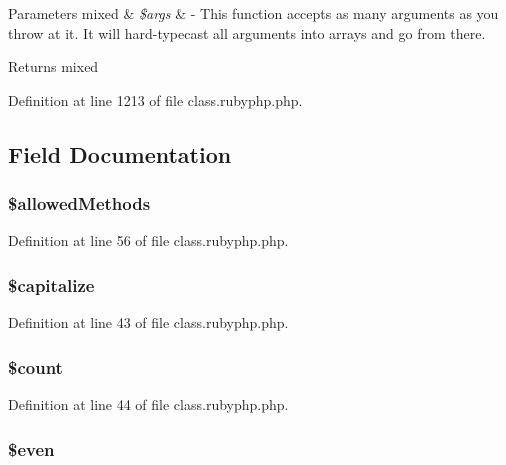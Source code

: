 \begin{DoxyParams}[1]{Parameters}
mixed & {\em \$args} & -\/ This function accepts as many arguments as you throw at it. It will hard-\/typecast all arguments into arrays and go from there. \\
\hline
\end{DoxyParams}
\begin{DoxyReturn}{Returns}
mixed 
\end{DoxyReturn}


Definition at line 1213 of file class.\-rubyphp.\-php.



\subsection{Field Documentation}
\hypertarget{classr_ab278eba7cab5341dacdccecd7a2cc2df}{
\subsubsection[{\$allowed\-Methods}]{\setlength{\rightskip}{0pt plus 5cm}\$allowed\-Methods}}\label{classr_ab278eba7cab5341dacdccecd7a2cc2df}


Definition at line 56 of file class.\-rubyphp.\-php.

\hypertarget{classr_a41c83fecb936997f3e2dae40207e31dd}{
\subsubsection[{\$capitalize}]{\setlength{\rightskip}{0pt plus 5cm}\$capitalize}}\label{classr_a41c83fecb936997f3e2dae40207e31dd}


Definition at line 43 of file class.\-rubyphp.\-php.

\hypertarget{classr_af789423037bbc89dc7c850e761177570}{
\subsubsection[{\$count}]{\setlength{\rightskip}{0pt plus 5cm}\$count}}\label{classr_af789423037bbc89dc7c850e761177570}


Definition at line 44 of file class.\-rubyphp.\-php.

\hypertarget{classr_ab661cd196618c18d23108b83a10728f3}{
\subsubsection[{\$even}]{\setlength{\rightskip}{0pt plus 5cm}\${\bf even}}}\label{classr_ab661cd196618c18d23108b83a10728f3}



